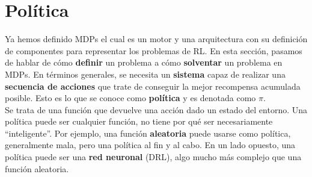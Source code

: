\documentclass[11pt,fleqn]{book} %
\begin{document}
%
%
%
%	
%	
%
%
%

\section{Política}\label{sec:politica}

Ya hemos definido MDPs el cual es un motor y una arquitectura con su definición de componentes para representar los problemas de RL. En esta sección, pasamos de hablar de cómo \textbf{definir} un problema a cómo \textbf{solventar} un problema en MDPs. En términos generales, se necesita un \textbf{sistema} capaz de realizar una \textbf{secuencia de acciones} que trate de conseguir la mejor recompensa acumulada posible. Esto es lo que se conoce como \textbf{política} y es denotada como $\pi$.\\

Se trata de una función que devuelve una acción dado un estado del entorno. Una política puede ser cualquier función, no tiene por qué ser necesariamente ``inteligente''. Por ejemplo, una función \textbf{aleatoria} puede usarse como política, generalmente mala, pero una política al fin y al cabo. En un lado opuesto, una política puede ser una \textbf{red neuronal} (DRL), algo mucho más complejo que una función aleatoria.\\
\end{document}
